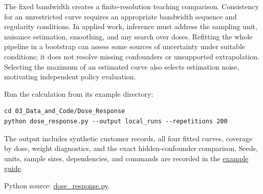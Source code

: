 The fixed bandwidth creates a finite-resolution teaching comparison.
Consistency for an unrestricted curve requires an appropriate bandwidth
sequence and regularity conditions. In applied work, inference must
address the sampling unit, nuisance estimation, smoothing, and any
search over doses. Refitting the whole pipeline in a bootstrap can
assess some sources of uncertainty under suitable conditions; it does
not resolve missing confounders or unsupported extrapolation. Selecting
the maximum of an estimated curve also selects estimation noise,
motivating independent policy evaluation.

Run the calculation from its example directory:

\begin{Verbatim}[breaklines,breakanywhere,fontsize=\small]
cd 03_Data_and_Code/Dose_Response
python dose_response.py --output local_runs --repetitions 200
\end{Verbatim}

The output includes synthetic customer records, all four fitted curves,
coverage by dose, weight diagnostics, and the exact hidden-confounder
comparison. Seeds, units, sample sizes, dependencies, and commands are
recorded in the
\href{../03_Data_and_Code/Dose_Response/README.md}{example guide}.

\FloatBarrier
{}
Python source:
\href{../03_Data_and_Code/Dose_Response/dose_response.py}{dose\_response.py}.


